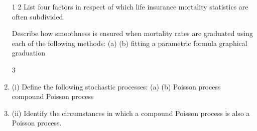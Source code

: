 \documentclass[a4paper,12pt]{article}
\begin{document}
\begin{enumerate}
1
2
List four factors in respect of which life insurance mortality statistics are often subdivided.

Describe how smoothness is ensured when mortality rates are graduated using each of the following methods:
(a)
(b)
fitting a parametric formula
graphical graduation

3
\item (i)
Define the following stochastic processes:
(a)
(b)
Poisson process
compound Poisson process

\item (ii)
Identify the circumstances in which a compound Poisson process is also a Poisson process.



\end{enumerate}
\end{document}
